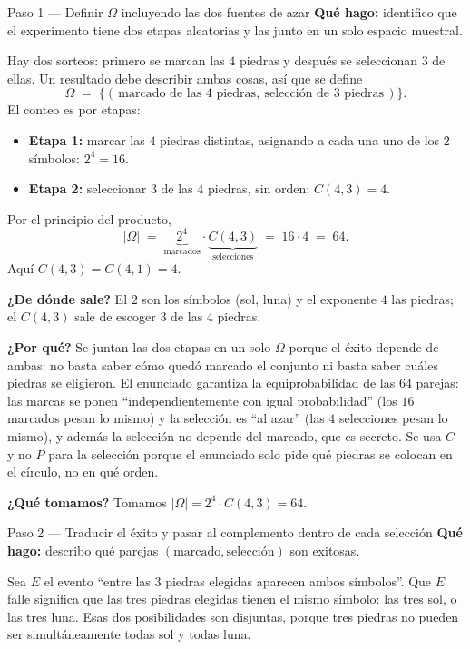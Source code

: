 \documentclass[11pt]{article}
\begin{document}
\begin{sol}

\begin{paso}{Paso 1 --- Definir $\Omega$ incluyendo las dos fuentes de azar}
\textbf{Qu\'e hago:} identifico que el experimento tiene dos etapas aleatorias y las junto en un solo espacio muestral.

Hay dos sorteos: primero se marcan las $4$ piedras y despu\'es se seleccionan $3$ de ellas. Un resultado debe describir ambas cosas, as\'i que se define
\[
\Omega \;=\; \{(\,\text{marcado de las 4 piedras},\ \text{selecci\'on de 3 piedras}\,)\}.
\]
El conteo es por etapas:
\begin{itemize}[leftmargin=*]
  \item \textbf{Etapa 1:} marcar las $4$ piedras distintas, asignando a cada una uno de los $2$ s\'imbolos: $2^{4}=16$.
  \item \textbf{Etapa 2:} seleccionar $3$ de las $4$ piedras, sin orden: $C(4,3)=4$.
\end{itemize}
Por el principio del producto,
\[
|\Omega| \;=\; \underbrace{2^{4}}_{\text{marcados}}\cdot\underbrace{C(4,3)}_{\text{selecciones}} \;=\; 16\cdot 4 \;=\; 64 .
\]
Aqu\'i $C(4,3)=C(4,1)=4$.

\textbf{¿De d\'onde sale?} El $2$ son los s\'imbolos (sol, luna) y el exponente $4$ las piedras; el $C(4,3)$ sale de escoger $3$ de las $4$ piedras.

\textbf{¿Por qu\'e?} Se juntan las dos etapas en un solo $\Omega$ porque el \'exito depende de ambas: no basta saber c\'omo qued\'o marcado el conjunto ni basta saber cu\'ales piedras se eligieron. El enunciado garantiza la equiprobabilidad de las $64$ parejas: las marcas se ponen ``independientemente con igual probabilidad'' (los $16$ marcados pesan lo mismo) y la selecci\'on es ``al azar'' (las $4$ selecciones pesan lo mismo), y adem\'as la selecci\'on no depende del marcado, que es secreto. Se usa $C$ y no $P$ para la selecci\'on porque el enunciado solo pide qu\'e piedras se colocan en el c\'irculo, no en qu\'e orden.

\textbf{¿Qu\'e tomamos?} Tomamos $|\Omega|=2^{4}\cdot C(4,3)=64$.
\end{paso}

\begin{paso}{Paso 2 --- Traducir el \'exito y pasar al complemento dentro de cada selecci\'on}
\textbf{Qu\'e hago:} describo qu\'e parejas $(\text{marcado},\text{selecci\'on})$ son exitosas.

Sea $E$ el evento ``entre las $3$ piedras elegidas aparecen ambos s\'imbolos''. Que $E$ falle significa que las tres piedras elegidas tienen el mismo s\'imbolo: las tres sol, o las tres luna. Esas dos posibilidades son disjuntas, porque tres piedras no pueden ser simult\'aneamente todas sol y todas luna.


\end{paso}
\end{sol}
\end{document}
